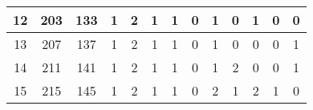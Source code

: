 \begin{sidewaystable}
\begin{tabular}{|c|c|c|c|c|c|c|c|c|c|c|c|c|}
		12                                                & 203                                               & 133                                               & 1                                                 & 2                                                 & 1                                                 & 1                                                 & 0                                                 & 1                                                 & 0                                                 & 1                                                 & 0                                                 & 0                                                 \\ \hline
		13                                                & 207                                               & 137                                               & 1                                                 & 2                                                 & 1                                                 & 1                                                 & 0                                                 & 1                                                 & 0                                                 & 0                                                 & 0                                                 & 1                                                 \\ \hline
		14                                                & 211                                               & 141                                               & 1                                                 & 2                                                 & 1                                                 & 1                                                 & 0                                                 & 1                                                 & 2                                                 & 0                                                 & 0                                                 & 1                                                 \\ \hline
		15                                                & 215                                               & 145                                               & 1                                                 & 2                                                 & 1                                                 & 1                                                 & 0                                                 & 2                                                 & 1                                                 & 2                                                 & 1                                                 & 0                                                 \\ \hline

\end{tabular}
\end{sidewaystable}
